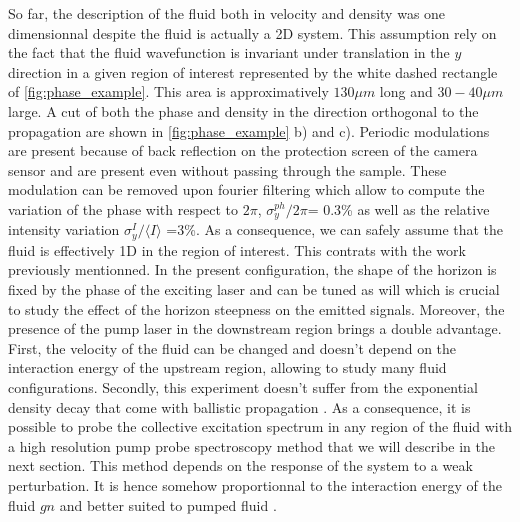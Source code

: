 So far, the description of the fluid both in velocity and density was one dimensionnal despite the fluid is actually a 2D system. This assumption
rely on the fact that the fluid wavefunction is invariant under translation in the $y$ direction in a given region of interest represented by the white dashed rectangle of \autoref{fig:phase_example}. This area is approximatively $130 \mu m$ long and $30-40 \mu m $ large. 
A cut of both the phase and density in the direction orthogonal to the propagation are shown in \autoref{fig:phase_example} b) and c). Periodic modulations are present because of back reflection on the protection screen of the camera sensor and are present even without passing through the sample. These modulation can be removed
upon fourier filtering which allow to compute the variation of the phase with respect to $2\pi$,  $\sigma_y^{ph}/2\pi$= 0.3\% as well as the relative intensity variation $\sigma_y^I/\langle I \rangle$ =3\%. As a consequence,
we can safely assume that the fluid is effectively 1D in the region of interest. This contrats with the work \cite{nguyen_acoustic_2015} previously mentionned. In the present configuration, the shape of the horizon is fixed by the phase of the exciting laser and can be tuned as will which is crucial to
study the effect of the horizon steepness on the emitted signals. Moreover, the presence of the pump laser in the downstream region brings a double advantage. First, the velocity of the fluid can be changed and doesn't depend on the interaction energy of the upstream region, allowing to study many fluid configurations.
Secondly, this experiment doesn't suffer from the exponential density decay that come with ballistic propagation \cite{long_range_ballistic_2013}. As a consequence, it is possible to probe the collective excitation spectrum in any region of the fluid with a high resolution pump probe spectroscopy method that we will describe in the next section. This 
 method depends on the response of the system to a weak perturbation. It is hence somehow proportionnal to the interaction energy of the fluid $gn$ and better suited to pumped fluid \cite{claude_high-resolution_2022}.

